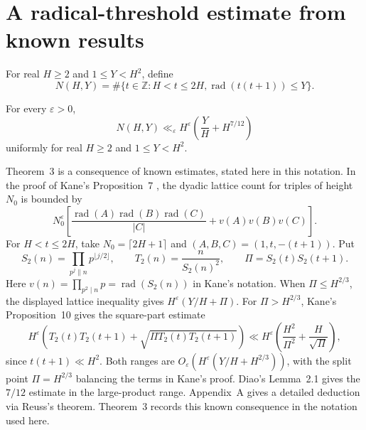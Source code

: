 \section{A radical-threshold estimate from known results}\label{sec:low-radical}

For real $H\ge2$ and $1\le Y<H^2$, define
\[
N(H,Y)=\#\{t\in\mathbb Z:H<t\le2H,
                 \operatorname{rad}(t(t+1))\le Y\}.
\]

\begin{theorem}\label{thm:low-radical}
For every $\varepsilon>0$,
\[
N(H,Y)\ll_\varepsilon H^\varepsilon
       \left(\frac YH+H^{7/12}\right)
\]
uniformly for real $H\ge2$ and $1\le Y<H^2$.
\end{theorem}

Theorem~3 is a consequence of known estimates, stated here in this notation.
In the proof of Kane's Proposition~7 \cite{Kane2014}, the dyadic
lattice count for triples of height $N_0$ is bounded by
\[
N_0^\varepsilon\left[
\frac{\operatorname{rad}(A)\operatorname{rad}(B)\operatorname{rad}(C)}{|C|}
+v(A)v(B)v(C)\right].
\]
For $H<t\le2H$, take $N_0=\lceil2H+1\rceil$ and
$(A,B,C)=(1,t,-(t+1))$. Put
 \[
S_2(n)=\prod_{p^j\parallel n}p^{\lfloor j/2\rfloor},\qquad
T_2(n)=\frac{n}{S_2(n)^2},\qquad
\Pi=S_2(t)S_2(t+1).
\]
Here $v(n)=\prod_{p^2\mid n}p=\operatorname{rad}(S_2(n))$ in Kane's
notation. When $\Pi\le H^{2/3}$, the displayed lattice
inequality gives $H^\varepsilon(Y/H+\Pi)$. For $\Pi>H^{2/3}$,
Kane's Proposition~10 \cite[Proposition~10]{Kane2014} gives the
square-part estimate
\[
H^\varepsilon\left(T_2(t)T_2(t+1)
 +\sqrt{\Pi T_2(t)T_2(t+1)}\right)
\ll H^\varepsilon\left(\frac{H^2}{\Pi^2}+\frac{H}{\sqrt{\Pi}}\right),
\]
since $t(t+1)\ll H^2$. Both ranges are
$O_\varepsilon(H^\varepsilon(Y/H+H^{2/3}))$, with the split point
$\Pi=H^{2/3}$ balancing the terms in Kane's proof. Diao's Lemma~2.1
\cite{Diao2026} gives the $7/12$ estimate in the large-product range.
Appendix~A gives a detailed deduction via Reuss's theorem. Theorem~3 records
this known consequence in the notation used here.

